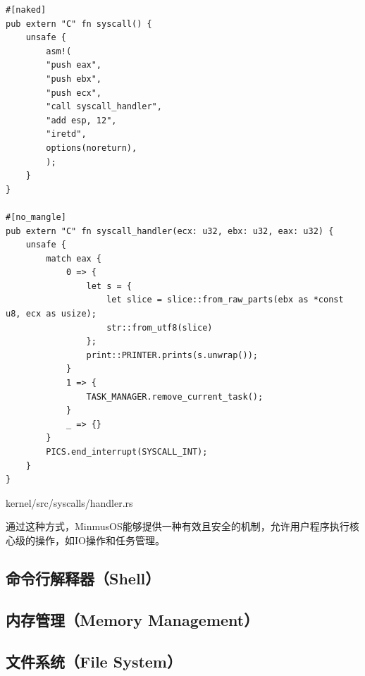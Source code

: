 \begin{listing}[htbp]
    \begin{verbatim}
#[naked]
pub extern "C" fn syscall() {
    unsafe {
        asm!(
        "push eax",
        "push ebx",
        "push ecx",
        "call syscall_handler",
        "add esp, 12",
        "iretd",
        options(noreturn),
        );
    }
}

#[no_mangle]
pub extern "C" fn syscall_handler(ecx: u32, ebx: u32, eax: u32) {
    unsafe {
        match eax {
            0 => {
                let s = {
                    let slice = slice::from_raw_parts(ebx as *const u8, ecx as usize);
                    str::from_utf8(slice)
                };
                print::PRINTER.prints(s.unwrap());
            }
            1 => {
                TASK_MANAGER.remove_current_task();
            }
            _ => {}
        }
        PICS.end_interrupt(SYSCALL_INT);
    }
}
    \end{verbatim}
    \caption{kernel/src/syscalls/handler.rs}\label{lst:HandlerRust}
\end{listing}

通过这种方式，MinmusOS能够提供一种有效且安全的机制，允许用户程序执行核心级的操作，如IO操作和任务管理。

\subsection{命令行解释器（Shell）}

\subsection{内存管理（Memory Management）}

\subsection{文件系统（File System）}